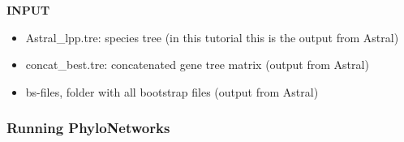 \documentclass[
  12pt,
]{article}
\providecommand{\tightlist}{%
  \setlength{\itemsep}{0pt}\setlength{\parskip}{0pt}}
\begin{document}
\textbf{INPUT}

\begin{itemize}
\tightlist
\item
  Astral\_lpp.tre: species tree (in this tutorial this is the output from Astral)
\item
  concat\_best.tre: concatenated gene tree matrix (output from Astral)
\item
  bs-files, folder with all bootstrap files (output from Astral)
\end{itemize}

\hypertarget{running-phylonetworks}{%
\subsubsection{Running PhyloNetworks}\label{running-phylonetworks}}
\end{document}
